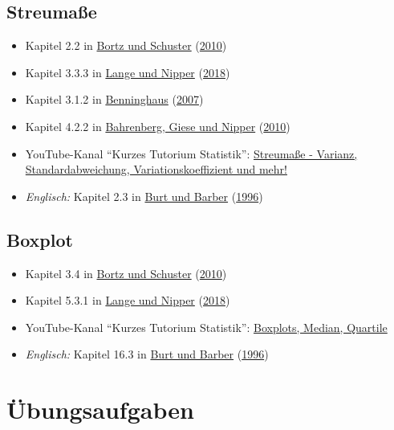\documentclass[
  11pt,
  ngerman,
  a4paper,
]{report}
\providecommand{\tightlist}{%
  \setlength{\itemsep}{0pt}\setlength{\parskip}{0pt}}
\begin{document}
\hypertarget{streumauxdfe-1}{%
\subsection{Streumaße}\label{streumauxdfe-1}}

\begin{itemize}
\tightlist
\item
  Kapitel 2.2 in \protect\hyperlink{ref-bortz}{Bortz und Schuster} (\protect\hyperlink{ref-bortz}{2010})
\item
  Kapitel 3.3.3 in \protect\hyperlink{ref-delange}{Lange und Nipper} (\protect\hyperlink{ref-delange}{2018})
\item
  Kapitel 3.1.2 in \protect\hyperlink{ref-benninghaus}{Benninghaus} (\protect\hyperlink{ref-benninghaus}{2007})
\item
  Kapitel 4.2.2 in \protect\hyperlink{ref-bahrenberg}{Bahrenberg, Giese und Nipper} (\protect\hyperlink{ref-bahrenberg}{2010})
\item
  YouTube-Kanal \enquote{Kurzes Tutorium Statistik}: \href{https://www.youtube.com/watch?v=3oZrS3ZWVcA}{Streumaße - Varianz, Standardabweichung, Variationskoeffizient und mehr!}
\item
  \emph{Englisch:} Kapitel 2.3 in \protect\hyperlink{ref-burt}{Burt und Barber} (\protect\hyperlink{ref-burt}{1996})
\end{itemize}

\hypertarget{boxplot-1}{%
\subsection{Boxplot}\label{boxplot-1}}

\begin{itemize}
\tightlist
\item
  Kapitel 3.4 in \protect\hyperlink{ref-bortz}{Bortz und Schuster} (\protect\hyperlink{ref-bortz}{2010})
\item
  Kapitel 5.3.1 in \protect\hyperlink{ref-delange}{Lange und Nipper} (\protect\hyperlink{ref-delange}{2018})
\item
  YouTube-Kanal \enquote{Kurzes Tutorium Statistik}: \href{https://www.youtube.com/watch?v=HsDeAoBOyS4}{Boxplots, Median, Quartile}
\item
  \emph{Englisch:} Kapitel 16.3 in \protect\hyperlink{ref-burt}{Burt und Barber} (\protect\hyperlink{ref-burt}{1996})
\end{itemize}

\hypertarget{uxfcbungsaufgaben-1}{%
\section*{Übungsaufgaben}\label{uxfcbungsaufgaben-1}}
\end{document}

